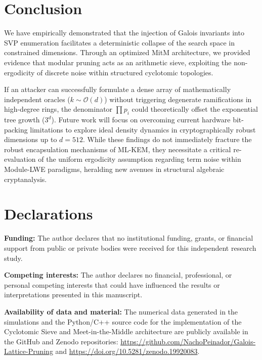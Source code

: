 \documentclass[sn-mathphys, a4paper]{sn-jnl}
\begin{document}
\section{Conclusion}

We have empirically demonstrated that the injection of Galois invariants into SVP enumeration facilitates a deterministic collapse of the search space in constrained dimensions. Through an optimized MitM architecture, we provided evidence that modular pruning acts as an arithmetic sieve, exploiting the non-ergodicity of discrete noise within structured cyclotomic topologies.

If an attacker can successfully formulate a dense array of mathematically independent oracles ($k \sim \mathcal{O}(d)$) without triggering degenerate ramifications in high-degree rings, the denominator $\prod p_i$ could theoretically offset the exponential tree growth ($3^d$). Future work will focus on overcoming current hardware bit-packing limitations to explore ideal density dynamics in cryptographically robust dimensions up to $d=512$. While these findings do not immediately fracture the robust encapsulation mechanisms of ML-KEM, they necessitate a critical re-evaluation of the uniform ergodicity assumption regarding term noise within Module-LWE paradigms, heralding new avenues in structural algebraic cryptanalysis.

\section*{Declarations}

\textbf{Funding:} The author declares that no institutional funding, grants, or financial support from public or private bodies were received for this independent research study.

\textbf{Competing interests:} The author declares no financial, professional, or personal competing interests that could have influenced the results or interpretations presented in this manuscript.

\textbf{Availability of data and material:} The numerical data generated in the simulations and the Python/C++ source code for the implementation of the Cyclotomic Sieve and Meet-in-the-Middle architecture are publicly available in the GitHub and Zenodo repositories: 
\url{https://github.com/NachoPeinador/Galois-Lattice-Pruning} and \url{https://doi.org/10.5281/zenodo.19920083}.
\end{document}

